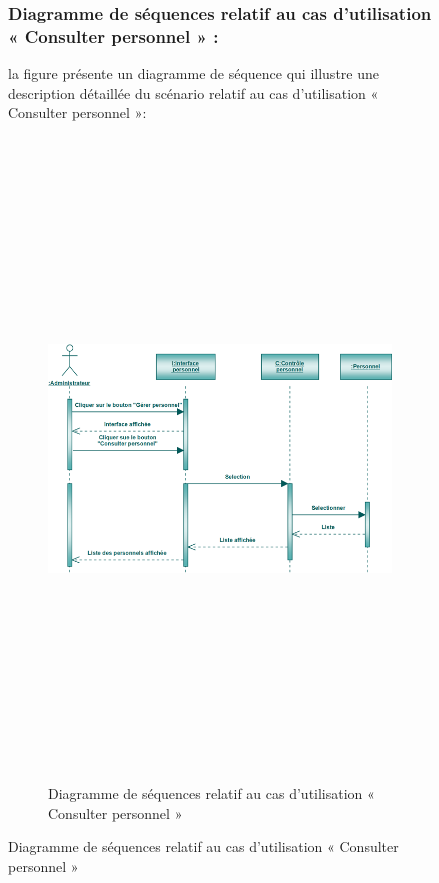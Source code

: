 \documentclass[12 pt]{report}
\begin{document}
\begin{figure}[h]
\begin{center}
\subsubsection{Diagramme de séquences relatif au cas d’utilisation « Consulter personnel » :}
la figure   présente un diagramme de séquence qui illustre une description détaillée du scénario relatif au cas d’utilisation « Consulter personnel »: 
{\begin{figure}[h]
 \begin{center}
\includegraphics[width= 18 cm ,height=  17cm]{sec_cons_per.PNG}
\caption{Diagramme de séquences relatif au cas d’utilisation « Consulter personnel  »}

\end{center}
\end{figure}}
\newpage

\end{center}
\end{figure}
\end{document}
